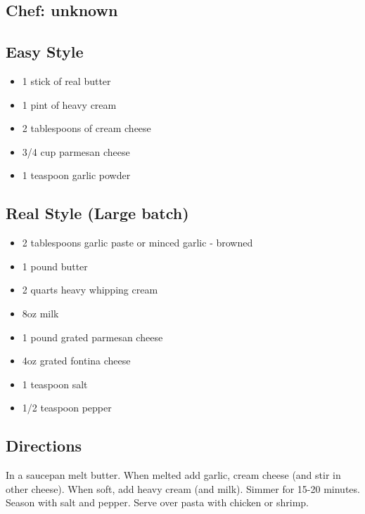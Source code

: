 \documentclass[
]{book}
\providecommand{\tightlist}{%
  \setlength{\itemsep}{0pt}\setlength{\parskip}{0pt}}
\begin{document}
\hypertarget{chef-unknown}{%
\subsection*{Chef: unknown}\label{chef-unknown}}


\hypertarget{easy-style}{%
\subsection*{Easy Style}\label{easy-style}}


\begin{itemize}
\tightlist
\item
  1 stick of real butter
\item
  1 pint of heavy cream
\item
  2 tablespoons of cream cheese
\item
  3/4 cup parmesan cheese
\item
  1 teaspoon garlic powder
\end{itemize}

\hypertarget{real-style-large-batch}{%
\subsection{Real Style (Large batch)}\label{real-style-large-batch}}

\begin{itemize}
\tightlist
\item
  2 tablespoons garlic paste or minced garlic - browned
\item
  1 pound butter
\item
  2 quarts heavy whipping cream
\item
  8oz milk
\item
  1 pound grated parmesan cheese
\item
  4oz grated fontina cheese
\item
  1 teaspoon salt
\item
  1/2 teaspoon pepper
\end{itemize}

\hypertarget{directions-62}{%
\subsection*{Directions}\label{directions-62}}


In a saucepan melt butter. When melted add garlic, cream cheese (and stir in other cheese). When soft, add heavy cream (and milk). Simmer for 15-20 minutes. Season with salt and pepper. Serve over pasta with chicken or shrimp.
\end{document}
